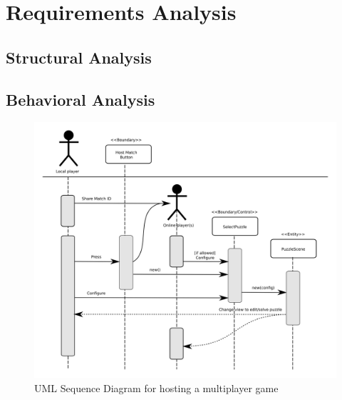 \documentclass[12pt]{article}
\begin{document}



\section{Requirements Analysis}

\subsection{Structural Analysis}\label{struct-analysis-BC}

\subsection{Behavioral Analysis}\label{behavioral-analysis-HR}

    \begin{figure}[H]
        \centering
        \includegraphics[width=6in]{sequence_host_match.png}
        \caption{UML Sequence Diagram for hosting a multiplayer game}
    \end{figure}
\end{document}

